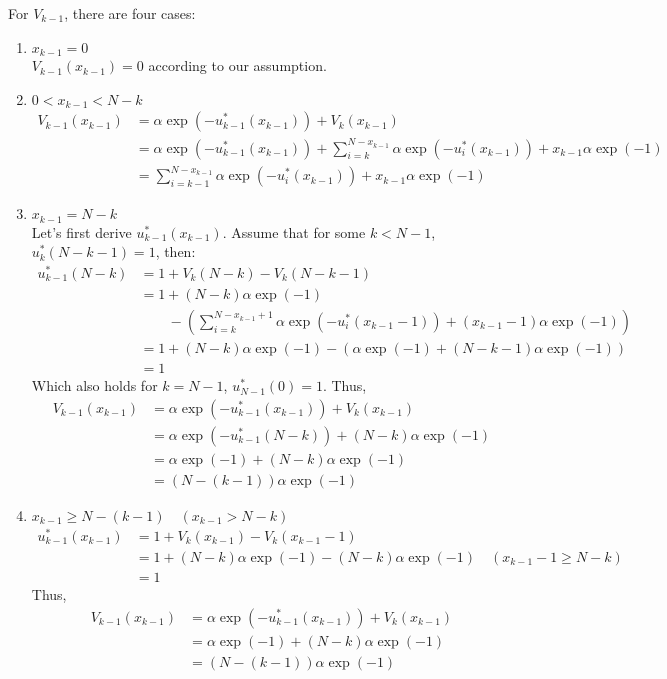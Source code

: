 \documentclass[11pt, a4paper, oneside]{memoir}
\begin{document}
For $V_{k-1}$, there are four cases:
\begin{enumerate}
  \item $x_{k-1} = 0$ \\
    $V_{k-1}(x_{k-1}) = 0$ according to our assumption.
  \item $0 < x_{k-1} < N-k$
    \begin{align*}
      V_{k-1}(x_{k-1}) &= \alpha \exp(-u_{k-1}^*(x_{k-1})) + V_k(x_{k-1}) \\
      &= \alpha \exp(-u_{k-1}^*(x_{k-1})) + \sum_{i=k}^{N-x_{k-1}} \alpha \exp(-u_i^*(x_{k-1})) + x_{k-1} \alpha \exp(-1) \\
      &= \sum_{i=k-1}^{N-x_{k-1}} \alpha \exp(-u_i^*(x_{k-1})) + x_{k-1} \alpha \exp(-1)
    \end{align*}
  \item $x_{k-1} = N-k$ \\
    Let's first derive $u_{k-1}^*(x_{k-1})$. Assume that for some $k < N-1$, $u_k^*(N-k-1) = 1$, then: 
    \begin{align*}
      u_{k-1}^*(N-k) &= 1 + V_k(N-k) - V_k(N-k-1) \\
      &= 1 + (N-k)\alpha \exp(-1) \\
      &\qquad - \left( \sum_{i=k}^{N-x_{k-1}+1} \alpha \exp(-u_i^*(x_{k-1}-1)) + (x_{k-1}-1) \alpha \exp(-1) \right) \\
      &= 1 + (N-k)\alpha \exp(-1) - \left( \alpha \exp(-1) + (N-k-1) \alpha \exp(-1) \right)\\
      &= 1
    \end{align*}
    Which also holds for $k=N-1$, $u_{N-1}^*(0) = 1$. Thus,
    \begin{align*}
      V_{k-1}(x_{k-1}) &= \alpha \exp(-u_{k-1}^*(x_{k-1})) + V_k(x_{k-1}) \\
      &= \alpha \exp(-u_{k-1}^*(N-k)) + (N-k)\alpha \exp(-1) \\
      &= \alpha \exp(-1) + (N-k) \alpha \exp(-1) \\
      &= (N-(k-1)) \alpha \exp(-1)
    \end{align*}
  \item $x_{k-1} \geq N-(k-1) \quad (x_{k-1} > N-k)$
    \begin{align*}
      u_{k-1}^*(x_{k-1}) &= 1 + V_k(x_{k-1}) - V_k(x_{k-1}-1) \\
      &= 1 + (N-k)\alpha \exp(-1) - (N-k)\alpha \exp(-1) \quad (x_{k-1}-1 \geq N-k)\\
      &= 1
    \end{align*}
    Thus,
    \begin{align*}
      V_{k-1}(x_{k-1}) &= \alpha \exp(-u_{k-1}^*(x_{k-1})) + V_k(x_{k-1}) \\
      &= \alpha \exp(-1) + (N-k)\alpha \exp(-1) \\
      &= (N-(k-1)) \alpha \exp(-1)
    \end{align*}
\end{enumerate}
\end{document}
